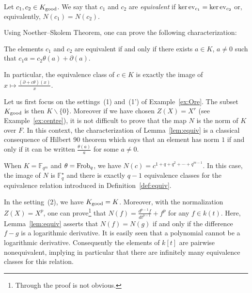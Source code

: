 \documentclass[a4paper]{llncs}
\newcommand{\FF}{\mathbb F}
\newcommand{\Frob}{\textrm{\rm Frob}}
\newcommand{\ev}[1]{\textrm{\rm ev}_{#1}}
\newcommand{\good}{\textrm{\rm good}}
\begin{document}

\begin{definition}
\label{def:equiv}
Let $c_1, c_2 \in K_\good$.
We say that $c_1$ and $c_2$ are \emph{equivalent} if
$\ker \ev{c_1} = \ker \ev{c_2}$ or, equivalently, $N(c_1) = N(c_2)$.
\end{definition}

\noindent
Using Noether--Skolem Theorem, one can prove the following
characterization:

\begin{lemma}
\label{lem:equiv}
The elements $c_1$ and $c_2$ are equivalent if and only if there exists 
$a \in K$, $a \neq 0$ such that $c_1 a = c_2 \theta(a) + \partial(a)$.

\noindent
In particular, the equivalence class of $c \in K$ is exactly the image 
of $x \mapsto \frac{(\partial + c\theta)(x)} x$.
\end{lemma}

\begin{example}
\label{ex:equiv}
Let us first focus on the settings~(1) and~(1') of Example~\ref{ex:Ore}. 
The subset $K_\good$ is then $K \backslash \{0\}$. Moreover if we have 
chosen $Z(X) = X^r$ (see Example~\ref{ex:centre}), it is not difficult
to prove that the map $N$ is the norm of $K$ over $F$.
In this context, the characterization of Lemma~\ref{lem:equiv} is 
a classical consequence of Hilbert 90 theorem which says that an
element has norm $1$ if and only if it can be written 
$\frac{\theta(a)} a$ for some $a \neq 0$.

\noindent
When $K = \FF_{q^m}$ and $\theta = \Frob_q$, we have 
$N(c) = c^{1 + q + q^2 + \cdots + q^{m-1}}$. In this case, the image of 
$N$ is $\FF_q^\star$ and there is exactly $q{-}1$ equivalence classes 
for the equivalence relation introduced in Definition~\ref{def:equiv}.

In the setting~(2), we have $K_\good = K$. Moreover, with the 
normalization $Z(X) = X^p$, one can prove\footnote{Through the proof is 
not obvious.} that $N(f) = \frac {d^{p-1}f}{dt^{p-1}} + f^p$ for any $f 
\in k(t)$. Here, Lemma~\ref{lem:equiv} asserts that $N(f) = N(g)$ if
and only if the difference $f-g$ is a logarithmic derivative.
It is easily seen that a polynomial cannot be a logarithmic derivative.
Consequently the elements of $k[t]$ are pairwise nonequivalent,
implying in particular that there are infinitely many equivalence
classes for this relation.
\end{example}
\end{document}
